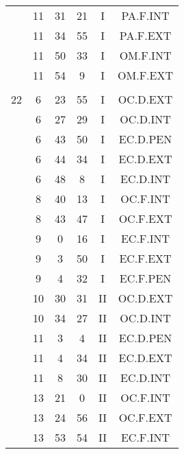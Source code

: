 \documentclass[12pt, a4paper]{article}
\begin{document}
\begin{multicols}{3}
{\begin{tabular}{c c c c c c}
	 	 	 	 & 11 & 31 & 21 & I & PA.F.INT\\%
	 	 	 	 & 11 & 34 & 55 & I & PA.F.EXT\\%
	 	 	 	 & 11 & 50 & 33 & I & OM.F.INT\\%
	 	 	 	 & 11 & 54 & 9 & I & OM.F.EXT\\%
	 	 	 	 & & & & & \\%
	 	 	 	22 & 6 & 23 & 55 & I & OC.D.EXT\\%
	 	 	 	 & 6 & 27 & 29 & I & OC.D.INT\\%
	 	 	 	 & 6 & 43 & 50 & I & EC.D.PEN\\%
	 	 	 	 & 6 & 44 & 34 & I & EC.D.EXT\\%
	 	 	 	 & 6 & 48 & 8 & I & EC.D.INT\\%
	 	 	 	 & 8 & 40 & 13 & I & OC.F.INT\\%
	 	 	 	 & 8 & 43 & 47 & I & OC.F.EXT\\%
	 	 	 	 & 9 & 0 & 16 & I & EC.F.INT\\%
	 	 	 	 & 9 & 3 & 50 & I & EC.F.EXT\\%
	 	 	 	 & 9 & 4 & 32 & I & EC.F.PEN\\%
	 	 	 	 & 10 & 30 & 31 & II & OC.D.EXT\\%
	 	 	 	 & 10 & 34 & 27 & II & OC.D.INT\\%
	 	 	 	 & 11 & 3 & 4 & II & EC.D.PEN\\%
	 	 	 	 & 11 & 4 & 34 & II & EC.D.EXT\\%
	 	 	 	 & 11 & 8 & 30 & II & EC.D.INT\\%
	 	 	 	 & 13 & 21 & 0 & II & OC.F.INT\\%
	 	 	 	 & 13 & 24 & 56 & II & OC.F.EXT\\%
	 	 	 	 & 13 & 53 & 54 & II & EC.F.INT\\%
	 	 \end{tabular}
 	}
\end{multicols}
\end{document}
